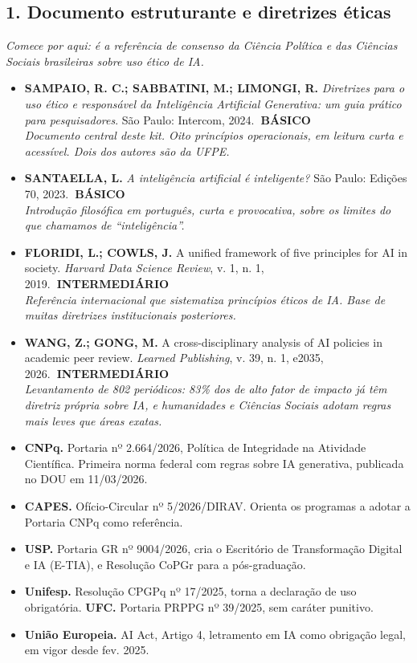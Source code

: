 \documentclass[11pt,a4paper]{article}
\newcommand{\iconBookmark}[1]{%
  \begin{tikzpicture}[baseline=-0.55ex]
    \draw[#1,line width=1pt,line join=round] (-0.11,0.15) -- (0.11,0.15) -- (0.11,-0.15) -- (0,-0.03) -- (-0.11,-0.15) -- cycle;
  \end{tikzpicture}}
\newcommand{\refc}[2]{\item #1\\{\footnotesize\color{cinzaescuro}\textit{#2}}}
\newcommand{\nivelbasico}{\hfill\colorbox{verdeCodigo}{\color{white}\scriptsize\poppinsmed\textbf{~BÁSICO~}}}
\newcommand{\nivelinterm}{\hfill\colorbox{amareloSol}{\color{black}\scriptsize\poppinsmed\textbf{~INTERMEDIÁRIO~}}}
\begin{document}
\subsection*{1. Documento estruturante e diretrizes éticas}
\textit{Comece por aqui: é a referência de consenso da Ciência Política e das Ciências Sociais brasileiras sobre uso ético de IA.}
\begin{itemize}[leftmargin=1.4em]
\refc{\textbf{SAMPAIO, R. C.; SABBATINI, M.; LIMONGI, R.} \textit{Diretrizes para o uso ético e responsável da Inteligência Artificial Generativa: um guia prático para pesquisadores}. São Paulo: Intercom, 2024.\nivelbasico}{Documento central deste kit. Oito princípios operacionais, em leitura curta e acessível. Dois dos autores são da UFPE.}
\refc{\textbf{SANTAELLA, L.} \textit{A inteligência artificial é inteligente?} São Paulo: Edições 70, 2023.\nivelbasico}{Introdução filosófica em português, curta e provocativa, sobre os limites do que chamamos de ``inteligência''.}
\refc{\textbf{FLORIDI, L.; COWLS, J.} A unified framework of five principles for AI in society. \textit{Harvard Data Science Review}, v. 1, n. 1, 2019.\nivelinterm}{Referência internacional que sistematiza princípios éticos de IA. Base de muitas diretrizes institucionais posteriores.}
\refc{\textbf{WANG, Z.; GONG, M.} A cross-disciplinary analysis of AI policies in academic peer review. \textit{Learned Publishing}, v. 39, n. 1, e2035, 2026.\nivelinterm}{Levantamento de 802 periódicos: 83\% dos de alto fator de impacto já têm diretriz própria sobre IA, e humanidades e Ciências Sociais adotam regras mais leves que áreas exatas.}
\end{itemize}

\begin{leitura}[title={\iconBookmark{white}\ \ Documentos normativos brasileiros e europeus}]
\begin{itemize}[leftmargin=1.2em,nosep]
\item \textbf{CNPq.} Portaria nº 2.664/2026, Política de Integridade na Atividade Científica. Primeira norma federal com regras sobre IA generativa, publicada no DOU em 11/03/2026.
\item \textbf{CAPES.} Ofício-Circular nº 5/2026/DIRAV. Orienta os programas a adotar a Portaria CNPq como referência.
\item \textbf{USP.} Portaria GR nº 9004/2026, cria o Escritório de Transformação Digital e IA (E-TIA), e Resolução CoPGr para a pós-graduação.
\item \textbf{Unifesp.} Resolução CPGPq nº 17/2025, torna a declaração de uso obrigatória. \textbf{UFC.} Portaria PRPPG nº 39/2025, sem caráter punitivo.
\item \textbf{União Europeia.} AI Act, Artigo 4, letramento em IA como obrigação legal, em vigor desde fev. 2025.
\end{itemize}
\end{leitura}
\end{document}
